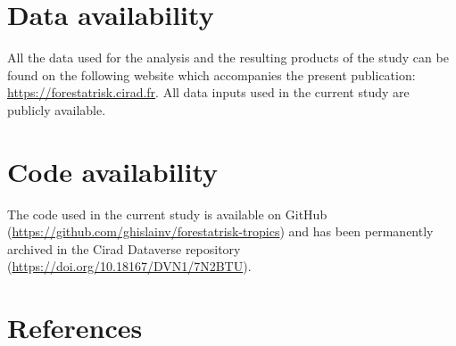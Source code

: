 \documentclass[
  12pt,
]{article}
\begin{document}
\section{Data availability}

All the data used for the analysis and the resulting products of the study can be found on the following website which accompanies the present publication: \url{https://forestatrisk.cirad.fr}. All data inputs used in the current study are publicly available.

\section{Code availability}

The code used in the current study is available on GitHub (\url{https://github.com/ghislainv/forestatrisk-tropics}) and has been permanently archived in the Cirad Dataverse repository (\url{https://doi.org/10.18167/DVN1/7N2BTU}).

\section{References}

\makeatletter
\apptocmd{\thebibliography}{\global\c@NAT@ctr 48\relax}{}{}
\makeatother
\end{document}
